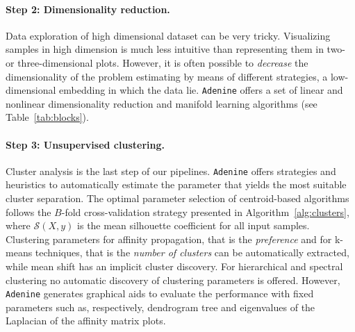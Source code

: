 \documentclass[twoside,11pt]{article}
\makeatletter
\newcommand{\ade}{\texttt{Adenine}\@\xspace}
\makeatother
\begin{document}
\paragraph{Step 2: Dimensionality reduction.}
  Data exploration of high dimensional dataset can be very tricky. Visualizing samples in high dimension is much less intuitive than representing them in two- or three-dimensional plots. However, it is often possible to \emph{decrease} the dimensionality of the problem estimating by means of different strategies, a low-dimensional embedding in which the data lie. %
  \ade offers a set of linear and nonlinear dimensionality reduction and manifold learning algorithms (see Table~\ref{tab:blocks}).

\paragraph{Step 3: Unsupervised clustering.}
  Cluster analysis is the last step of our pipelines. 
  \ade offers strategies and heuristics to automatically estimate the parameter that yields the most suitable cluster separation. The optimal parameter selection of centroid-based algorithms follows the $B$-fold cross-validation strategy presented in Algorithm~\ref{alg:clusters}, where $\mathcal{S}(X,y)$ is the mean silhouette coefficient \citep{rousseeuw1987silhouettes} for all input samples.
  Clustering parameters for affinity propagation, that is the \emph{preference} \citep{frey2007clustering} and for k-means techniques, that is the \emph{number of clusters} \citep{bishop2006pattern} can be automatically extracted, while mean shift \citep{comaniciu2002mean} has an implicit cluster discovery.
  For hierarchical \citep{friedman2001elements} and spectral clustering \citep{shi2000normalized} no automatic discovery of clustering parameters is offered. However, \ade generates graphical aids to evaluate the performance with fixed parameters such as, respectively, dendrogram tree and eigenvalues of the Laplacian of the affinity matrix plots.
 
\end{document}
